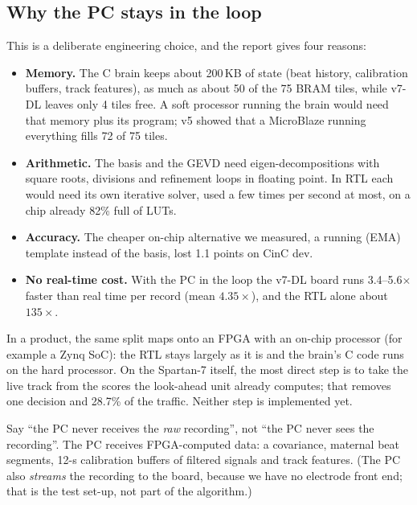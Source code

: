 \documentclass[11pt]{article}
\begin{document}
\subsection{Why the PC stays in the loop}
\label{sec:pcloop}
This is a deliberate engineering choice, and the report gives four reasons:
\begin{itemize}
  \item \textbf{Memory.} The C brain keeps about 200\,KB of state (beat history, calibration buffers, track features), as much as about 50 of the 75 BRAM tiles, while v7-DL leaves only 4 tiles free. A soft processor running the brain would need that memory plus its program; v5 showed that a MicroBlaze running everything fills 72 of 75 tiles.
  \item \textbf{Arithmetic.} The basis and the GEVD need eigen-decompositions with square roots, divisions and refinement loops in floating point. In RTL each would need its own iterative solver, used a few times per second at most, on a chip already 82\% full of LUTs.
  \item \textbf{Accuracy.} The cheaper on-chip alternative we measured, a running (EMA) template instead of the basis, lost 1.1 points on CinC dev.
  \item \textbf{No real-time cost.} With the PC in the loop the v7-DL board runs 3.4--5.6$\times$ faster than real time per record (mean $4.35\times$), and the RTL alone about $135\times$.
\end{itemize}

\begin{simple}
In a product, the same split maps onto an FPGA with an on-chip processor (for example a Zynq SoC): the RTL stays largely as it is and the brain's C code runs on the hard processor. On the Spartan-7 itself, the most direct step is to take the live track from the scores the look-ahead unit already computes; that removes one decision and 28.7\% of the traffic. Neither step is implemented yet.
\end{simple}

\begin{warn}
Say ``the PC never receives the \emph{raw} recording'', not ``the PC never sees the recording''. The PC receives FPGA-computed data: a covariance, maternal beat segments, 12-s calibration buffers of filtered signals and track features. (The PC also \emph{streams} the recording to the board, because we have no electrode front end; that is the test set-up, not part of the algorithm.)
\end{warn}
\end{document}
